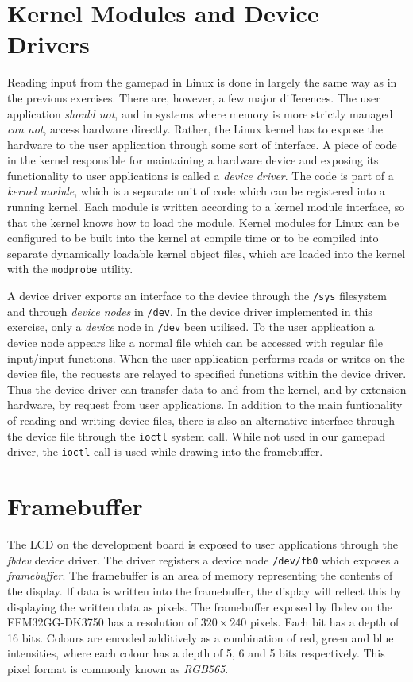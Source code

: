 \section{Kernel Modules and Device Drivers}

Reading input from the gamepad in Linux is done in largely the same way as in
the previous exercises. There are, however, a few major differences. The user
application \emph{should not}, and in systems where memory is more strictly
managed \emph{can not}, access hardware directly. Rather, the Linux kernel has
to expose the hardware to the user application through some sort of interface.
A piece of code in the kernel responsible for maintaining a hardware device and
exposing its functionality to user applications is called a \emph{device
driver}. The code is part of a \emph{kernel module}, which is a separate unit of
code which can be registered into a running kernel. Each module is written
according to a kernel module interface, so that the kernel knows how to load the
module. Kernel modules for Linux can be configured to be built into the kernel
at compile time or to be compiled into separate dynamically loadable kernel
object files, which are loaded into the kernel with the \texttt{modprobe}
utility.

A device driver exports an interface to the device through the \texttt{/sys}
filesystem and through \emph{device nodes} in \texttt{/dev}. In the device
driver implemented in this exercise, only a \emph{device} node in \texttt{/dev}
been utilised. To the user application a device node appears like a normal file
which can be accessed with regular file input/input functions. When the user
application performs reads or writes on the device file, the requests are
relayed to specified functions within the device driver. Thus the device driver
can transfer data to and from the kernel, and by extension hardware, by request
from user applications. In addition to the main funtionality of reading and
writing device files, there is also an alternative interface through the device
file through the \texttt{ioctl} system call. While not used in our gamepad
driver, the \texttt{ioctl} call is used while drawing into the framebuffer.

\section{Framebuffer}

The LCD on the development board is exposed to user applications through the
\emph{fbdev} device driver. The driver registers a device node \texttt{/dev/fb0}
which exposes a \emph{framebuffer}. The framebuffer is an area of memory
representing the contents of the display. If data is written into the
framebuffer, the display will reflect this by displaying the written data as
pixels. The framebuffer exposed by fbdev on the EFM32GG-DK3750 has a resolution
of \(320 \times 240\) pixels. Each bit has a depth of 16 bits. Colours are
encoded additively as a combination of red, green and blue intensities, where
each colour has a depth of 5, 6 and 5 bits respectively. This pixel format is
commonly known as \emph{RGB565}.
